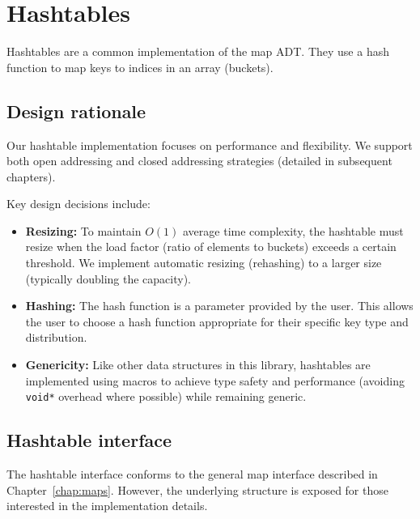 \chapter{Hashtables}\label{chap:hashtables}

Hashtables are a common implementation of the map ADT. They use a hash function to map keys to indices in an array (buckets).

\section{Design rationale}

Our hashtable implementation focuses on performance and flexibility. We support both open addressing and closed addressing strategies (detailed in subsequent chapters).

Key design decisions include:
\begin{itemize}
    \item \textbf{Resizing:} To maintain $O(1)$ average time complexity, the hashtable must resize when the load factor (ratio of elements to buckets) exceeds a certain threshold. We implement automatic resizing (rehashing) to a larger size (typically doubling the capacity).
    \item \textbf{Hashing:} The hash function is a parameter provided by the user. This allows the user to choose a hash function appropriate for their specific key type and distribution.
    \item \textbf{Genericity:} Like other data structures in this library, hashtables are implemented using macros to achieve type safety and performance (avoiding \texttt{void*} overhead where possible) while remaining generic.
\end{itemize}

\section{Hashtable interface}

The hashtable interface conforms to the general map interface described in Chapter~\ref{chap:maps}. However, the underlying structure is exposed for those interested in the implementation details.

\begin{code}
  
  \caption{The linear hashtable structure.}
  \label{code:hashtable:struct}
\end{code}
